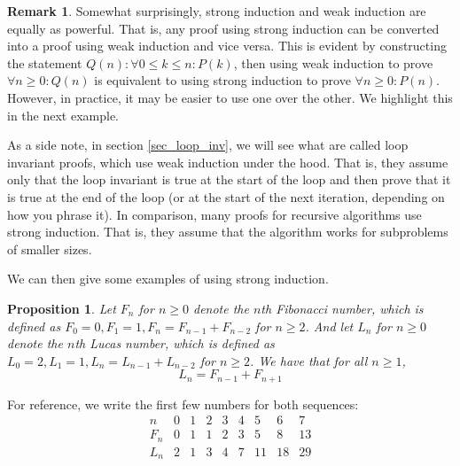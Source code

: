 \documentclass{article}
\theoremstyle{plain}
\newtheorem{proposition}[theorem]{Proposition}
\theoremstyle{definition}
\newtheorem{remark}[theorem]{Remark}
\begin{document}
\begin{remark}
Somewhat surprisingly, strong induction and weak induction are equally as powerful. That is, any proof using strong induction can be converted into a proof using weak induction and vice versa. This is evident by constructing the statement \(Q(n): \forall 0 \leq k \leq n : P(k)\), then using weak induction to prove \(\forall n \geq 0 : Q(n)\) is equivalent to using strong induction to prove \(\forall n \geq 0 : P(n)\). However, in practice, it may be easier to use one over the other. We highlight this in the next example.
\end{remark}

As a side note, in section \cref{sec_loop_inv}, we will see what are called loop invariant proofs, which use weak induction under the hood. That is, they assume only that the loop invariant is true at the start of the loop and then prove that it is true at the end of the loop (or at the start of the next iteration, depending on how you phrase it). In comparison, many proofs for recursive algorithms use strong induction. That is, they assume that the algorithm works for subproblems of smaller sizes.

We can then give some examples of using strong induction.

\begin{proposition}
    Let \(F_n\) for \(n \geq 0\) denote the \(n\)th Fibonacci number, which is defined as \(F_0 = 0, F_1 = 1, F_n = F_{n-1} + F_{n-2}\) for \(n \geq 2\). And let \(L_n\) for \(n \geq 0\) denote the \(n\)th Lucas number, which is defined as \(L_0 = 2, L_1 = 1, L_n = L_{n-1} + L_{n-2}\) for \(n \geq 2\). We have that for all \(n \geq 1\),
    \[L_n = F_{n-1} + F_{n+1}\]
\end{proposition}

For reference, we write the first few numbers for both sequences:
\[\begin{array}{c|c|c|c|c|c|c|c|c}
    n   & 0 & 1 & 2 & 3 & 4 & 5 & 6 & 7 \\
    \hline \hline
    F_n & 0 & 1 & 1 & 2 & 3 & 5 & 8 & 13 \\
    \hline
    L_n & 2 & 1 & 3 & 4 & 7 & 11 & 18 & 29 \\
\end{array}\]
\end{document}

